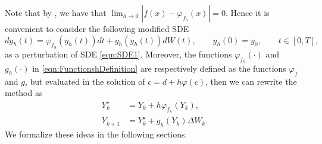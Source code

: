 \begin{remark}\label{rmk:PertrubedSDE}
	Note that by , we have that 
	$\displaystyle\lim_{h\to 0}|f(x)-\varphi_{f_h}(x)|=0$.
	Hence it is convenient to  consider the following modified SDE
	\begin{equation*} %
		dy_h(t)= \varphi_{f_h}(y_h(t))dt +g_h(y_h(t))dW(t),
		\qquad y_h(0)=y_0,  \qquad t\in [0,T],
	\end{equation*}
	as a perturbation of SDE \eqref{eqn:SDE1}. 
	Moreover, the functions $\varphi_{f_h}(\cdot)$ and $g_h(\cdot)$ in \eqref{eqn:FunctionshDefinition} are
	respectively defined as the functions $\varphi_{f}$ and $g$, but  evaluated in the solution of $c=d + h\varphi(c)$, 
	then we can rewrite the \SM method  as
	\begin{align*}
		Y_k^{\star} &= Y_k + h \varphi_{f_h}(Y_k),\\
		Y_{k+1} &= Y_k^{\star} + g_h(Y_k)\Delta W_k.
	\end{align*}
	We formalize these ideas in the following sections.
\end{remark}
%
